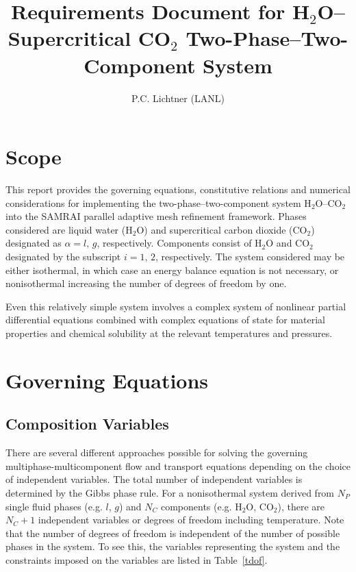 \documentclass[12pt]{article}
\author{P.C. Lichtner (LANL)}
\title{Requirements Document for H$_2$O--Supercritical CO$_2$ Two-Phase--Two-Component System}
\renewcommand{\a}{{\alpha}}
\begin{document}
\maketitle

\tableofcontents

\section{Scope}

This report provides the governing equations, constitutive relations and numerical considerations for implementing the two-phase--two-component system H$_2$O--CO$_2$ into the SAMRAI parallel adaptive mesh refinement framework. Phases considered are liquid water (H$_2$O) and supercritical carbon dioxide (CO$_2$) designated as $\a = l,\, g$, respectively. Components consist of H$_2$O and CO$_2$ designated by the subscript $i=1,\,2$, respectively. The system considered may be either isothermal, in which case an energy balance equation is not necessary, or nonisothermal increasing the number of degrees of freedom by one.

Even this relatively simple system involves a complex system of nonlinear partial differential equations combined with complex equations of state for material properties and chemical solubility at the relevant temperatures and pressures.

\section{Governing Equations}

\subsection{Composition Variables}

There are several different approaches possible for solving the governing multiphase-multicomponent flow and transport equations depending on the choice of independent variables. The total number of independent variables is determined by the Gibbs phase rule. 
For a nonisothermal system derived from $N_P$ single fluid phases (e.g. $l$, $g$) and $N_C$ components (e.g. H$_2$O, CO$_2$), there are $N_C+1$ independent variables or degrees of freedom including temperature. 
Note that the number of degrees of freedom is independent of the number of possible phases in the system. To see this, the variables representing the system and the constraints imposed on the variables are listed in Table~\ref{tdof}.
\end{document}
